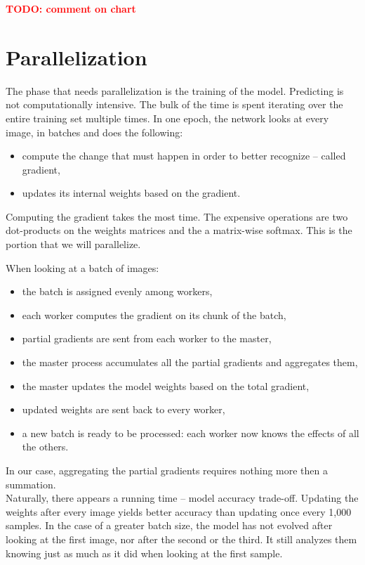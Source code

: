 \documentclass[a4paper]{article}
\newcommand{\TODO}[1]{\noindent \textbf{\textcolor{red}{TODO: #1}}}
\begin{document}
\TODO{comment on chart}



\newpage
\section{Parallelization}
The phase that needs parallelization is the training of the model. Predicting is not computationally intensive. The bulk of the time is spent iterating over the entire training set multiple times. In one epoch, the network looks at every image, in batches and does the following:
\begin{itemize}
\item compute the change that must happen in order to better recognize -- called gradient,
\item updates its internal weights based on the gradient.
\end{itemize}
Computing the gradient takes the most time. The expensive operations are two dot-products on the weights matrices and the a matrix-wise softmax. This is the portion that we will parallelize.

When looking at a batch of images:
\begin{itemize}
\item the batch is assigned evenly among workers,
\item each worker computes the gradient on its chunk of the batch,
\item partial gradients are sent from each worker to the master,
\item the master process accumulates all the partial gradients and aggregates them,
\item the master updates the model weights based on the total gradient,
\item updated weights are sent back to every worker,
\item a new batch is ready to be processed: each worker now knows the effects of all the others.
\end{itemize}
In our case, aggregating the partial gradients requires nothing more then a summation.
\\

Naturally, there appears a running time -- model accuracy trade-off. Updating the weights after every image yields better accuracy than updating once every 1,000 samples. In the case of a greater batch size, the model has not evolved after looking at the first image, nor after the second or the third. It still analyzes them knowing just as much as it did when looking at the first sample.
\end{document}
